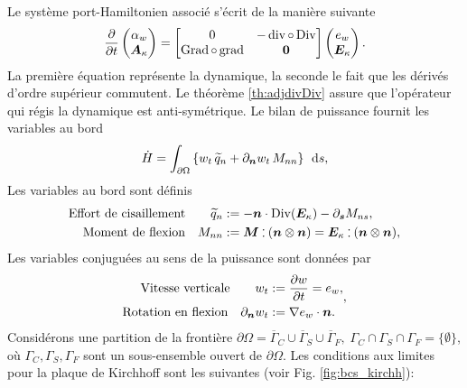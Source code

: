 Le système port-Hamiltonien associé s'écrit de la manière suivante
\begin{equation*}
\diffp{}{t}
\begin{pmatrix}
\alpha_w \\
\bm{A}_{\kappa} \\
\end{pmatrix} = 
\begin{bmatrix}
0  &  - \div \circ \Div \\
\Grad \circ \grad & \bm{0} \\
\end{bmatrix}
\begin{pmatrix}
e_w \\
\bm{E}_{\kappa} \\
\end{pmatrix}.
\end{equation*}
La première équation représente la dynamique, la seconde le fait que les dérivés d'ordre supérieur commutent. Le théorème \ref{th:adjdivDiv} assure que l'opérateur qui régis la dynamique est anti-symétrique. Le bilan de puissance fournit les variables au bord
\begin{equation*}
\dot{H} = \int_{\partial \Omega} \left\{ w_t \, \widetilde{q}_n + \partial_{\bm{n}}{w_t} \, M_{nn}\right\} \, \d{s}, 
\end{equation*} 
Les variables au bord sont définis 
\begin{equation*}
	\begin{aligned}
	\text{Effort de cisaillement}  \qquad \widetilde{q}_{n} &:= - \bm{n} \cdot \mathrm{Div}(\bm{E}_{\kappa}) - \partial_{\bm{s}}{M_{ns}}, \\
	\text{Moment de flexion} \quad M_{nn} &:=  \bm{M} \cddot (\bm{n}\otimes{\bm{n}}) = \bm{E}_{\kappa} \cddot (\bm{n}\otimes{\bm{n}}),
	\end{aligned}
\end{equation*}
Les variables conjuguées au sens de la puissance sont données par
\begin{equation*}
	\begin{aligned}
	\text{Vitesse verticale}  \qquad w_t &:= \diffp{w}{t} = e_w, \\
	\text{Rotation en flexion} \quad 
	\partial_{\bm{n}}{w_t} &:= \nabla{e_w} \cdot \bm{n}.
	\end{aligned},
\end{equation*}
Considérons une partition de la frontière $ \partial \Omega = \overline{\Gamma}_{C} \cup \overline{\Gamma}_{S} \cup \overline {\Gamma}_{F}, \; {\Gamma}_{C} \cap {\Gamma}_{S} \cap {\Gamma}_{F} = \{\emptyset\} $, où $ {\Gamma}_{C}, {\Gamma}_{S}, {\Gamma}_{F} $ sont un sous-ensemble ouvert de $\partial \Omega $. Les conditions aux limites pour la plaque de Kirchhoff \cite{gustafsson2018} sont les suivantes (voir Fig. \ref{fig:bcs_kirchh}):
